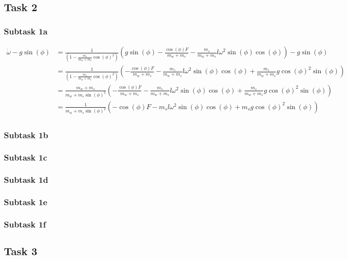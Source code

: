 \documentclass[a4paper, 12pt]{scrartcl}
\begin{document}
\subsection{Task 2}
\subsubsection{Subtask 1a}
\begin{equation}
	\begin{aligned}
	\dot{\omega} - g\sin(\phi) 
	&= \frac{1}{\left(1-\frac{m_s}{m_w + m_s} \cos(\phi)^2\right)} \left( g \sin(\phi) -  \frac{\cos(\phi)F}{m_w + m_s} - \frac{m_s}{m_w + m_s} {l \omega^2} \sin(\phi) \cos(\phi) \right) - g\sin(\phi)\\
	&= \frac{1}{\left(1-\frac{m_s}{m_w + m_s} \cos(\phi)^2\right)} \left( -\frac{\cos(\phi)F}{m_w + m_s} - \frac{m_s}{m_w + m_s} {l \omega^2} \sin(\phi) \cos(\phi) +\frac{m_s}{m_w + m_s} g\cos(\phi)^2 \sin(\phi) \right)\\
	&= \frac{m_w + m_s}{m_w+ m_s\sin(\phi)^2} \left( -\frac{\cos(\phi)F}{m_w + m_s} - \frac{m_s}{m_w + m_s} {l \omega^2} \sin(\phi) \cos(\phi) +\frac{m_s}{m_w + m_s} g\cos(\phi)^2 \sin(\phi) \right)\\
	&= \frac{1}{m_w+ m_s\sin(\phi)^2} \left( -\cos(\phi)F - m_s {l \omega^2} \sin(\phi) \cos(\phi) +m_s g\cos(\phi)^2 \sin(\phi) \right)\\
	\end{aligned}
\end{equation}

\subsubsection{Subtask 1b}
\subsubsection{Subtask 1c}
\subsubsection{Subtask 1d}
\subsubsection{Subtask 1e}
\subsubsection{Subtask 1f}

\subsection{Task 3}
\end{document}
